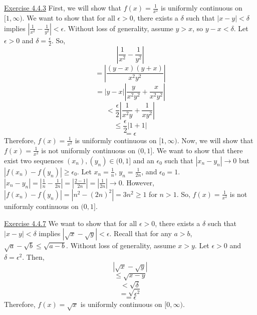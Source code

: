 \documentclass{exam}
\begin{document}
\underline{Exercise 4.4.3}
\newline
\newline
First, we will show that $f(x)=\frac{1}{x^2}$ is uniformly continuous on $[1,\infty)$. We want to show that for all $\epsilon>0$, there exists a $\delta$ such that $|x-y|<\delta$ implies $|\frac{1}{x^2}-\frac{1}{y^2}|<\epsilon$. Without loss of generality, assume $y>x$, so $y-x<\delta$. Let $\epsilon>0$ and $\delta=\frac{\epsilon}{2}$. So,
\[\left|\frac{1}{x^2}-\frac{1}{y^2}\right|\]
\[=\left|\frac{(y-x)(y+x)}{x^2y^2}\right|\]
\[=|y-x|\left|\frac{y}{x^2y^2}+\frac{x}{x^2y^2}\right|\]
\[<\frac{\epsilon}{2}\left|\frac{1}{x^2y}+\frac{1}{xy^2}\right|\]
\[\le\frac{\epsilon}{2}|1+1|\]
\[=\epsilon\]
Therefore, $f(x)=\frac{1}{x^2}$ is uniformly continuous on $[1,\infty)$.
\newline
\newline
Now, we will show that $f(x)=\frac{1}{x^2}$ is not uniformly continuous on $(0,1]$. We want to show that there exist two sequences $(x_n),(y_n)\in(0,1]$ and an $\epsilon_0$ such that $|x_n-y_n|\to0$ but $|f(x_n)-f(y_n)|\ge\epsilon_0$. Let $x_n=\frac{1}{n}$, $y_n=\frac{1}{2n}$, and $\epsilon_0=1$. $|x_n-y_n|=|\frac{1}{n}-\frac{1}{2n}|=|\frac{2-1}{2n}|=|\frac{1}{2n}|\to0$. However, $|f(x_n)-f(y_n)|=|n^2-(2n)^2|=3n^2\ge1$ for $n>1$. So, $f(x)=\frac{1}{x^2}$ is not uniformly continuous on $(0,1]$.
\newline

\underline{Exercise 4.4.7}
\newline
\newline
We want to show that for all $\epsilon>0$, there exists a $\delta$ such that $|x-y|<\delta$ implies $|\sqrt{x}-\sqrt{y}|<\epsilon$. Recall that for any $a>b$, $\sqrt{a}-\sqrt{b}\le\sqrt{a-b}$. Without loss of generality, assume $x>y$. Let $\epsilon>0$ and $\delta=\epsilon^2$. Then,
\[|\sqrt{x}-\sqrt{y}|\]
\[\le\sqrt{x-y}\]
\[<\sqrt{\delta}\]
\[=\sqrt{\epsilon^2}\]
\[=\epsilon\]
Therefore, $f(x)=\sqrt{x}$ is uniformly continuous on $[0,\infty)$.
\newline
\end{document}
